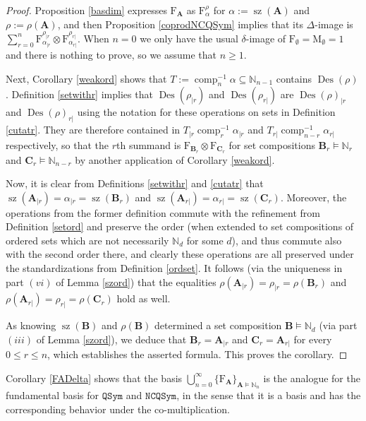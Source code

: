 \documentclass{article}
\theoremstyle{definition}
\begin{document}
\begin{proof}
Proposition \ref{basdim} expresses $\mathrm{F}_{\mathbf{A}}$ as $\mathrm{F}_{\alpha}^{\rho}$ for $\alpha:=\operatorname{sz}(\mathbf{A})$ and $\rho:=\rho(\mathbf{A})$, and then Proposition \ref{coprodNCQSym} implies that its $\Delta$-image is $\sum_{r=0}^{n}\mathrm{F}_{\alpha_{|r}}^{\rho_{|r}}\otimes\mathrm{F}_{\alpha_{r|}}^{\rho_{r|}}$. When $n=0$ we only have the usual $\delta$-image of $\mathrm{F}_{\emptyset}=\mathrm{M}_{\emptyset}=1$ and there is nothing to prove, so we assume that $n\geq1$.

Next, Corollary \ref{weakord} shows that $T:=\operatorname{comp}_{n}^{-1}\alpha\subseteq\mathbb{N}_{n-1}$ contains $\operatorname{Des}(\rho)$. Definition \ref{setwithr} implies that $\operatorname{Des}(\rho_{|r})$ and $\operatorname{Des}(\rho_{r|})$ are $\operatorname{Des}(\rho)_{|r}$ and $\operatorname{Des}(\rho)_{r|}$ using the notation for these operations on sets in Definition \ref{cutatr}. They are therefore contained in $T_{|r}\operatorname{comp}_{r}^{-1}\alpha_{|r}$ and $T_{r|}\operatorname{comp}_{n-r}^{-1}\alpha_{r|}$ respectively, so that the $r$th summand is $\mathrm{F}_{\mathbf{B}_{r}}\otimes\mathrm{F}_{\mathbf{C}_{r}}$ for set compositions $\mathbf{B}_{r}\vDash\mathbb{N}_{r}$ and $\mathbf{C}_{r}\vDash\mathbb{N}_{n-r}$ by another application of Corollary \ref{weakord}.

Now, it is clear from Definitions \ref{setwithr} and \ref{cutatr} that $\operatorname{sz}(\mathbf{A}_{|r})=\alpha_{|r}=\operatorname{sz}(\mathbf{B}_{r})$ and $\operatorname{sz}(\mathbf{A}_{r|})=\alpha_{r|}=\operatorname{sz}(\mathbf{C}_{r})$. Moreover, the operations from the former definition commute with the refinement from Definition \ref{setord} and preserve the order (when extended to set compositions of ordered sets which are not necessarily $\mathbb{N}_{d}$ for some $d$), and thus commute also with the second order there, and clearly these operations are all preserved under the standardizations from Definition \ref{ordset}. It follows (via the uniqueness in part $(vi)$ of Lemma \ref{szord}) that the equalities $\rho(\mathbf{A}_{|r})=\rho_{|r}=\rho(\mathbf{B}_{r})$ and $\rho(\mathbf{A}_{r|})=\rho_{r|}=\rho(\mathbf{C}_{r})$ hold as well.

As knowing $\operatorname{sz}(\mathbf{B})$ and $\rho(\mathbf{B})$ determined a set composition $\mathbf{B}\vDash\mathbb{N}_{d}$ (via part $(iii)$ of Lemma \ref{szord}), we deduce that $\mathbf{B}_{r}=\mathbf{A}_{|r}$ and $\mathbf{C}_{r}=\mathbf{A}_{r|}$ for every $0 \leq r \leq n$, which establishes the asserted formula. This proves the corollary.
\end{proof}
Corollary \ref{FADelta} shows that the basis $\bigcup_{n=0}^{\infty}\{\mathrm{F}_{\mathbf{A}}\}_{\mathbf{A}\vDash\mathbb{N}_{n}}$ is the analogue for the fundamental basis for $\mathtt{QSym}$ and $\mathtt{NCQSym}$, in the sense that it is a basis and has the corresponding behavior under the co-multiplication.
\end{document}

